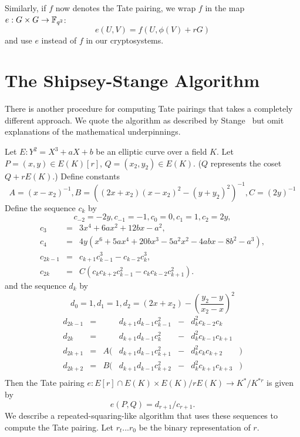 Similarly, if $f$ now denotes the Tate pairing,
we wrap $f$ in the map
$e : G\times G \rightarrow \mathbb{F}_{q^2}$:
\[ e(U, V) = f(U, \phi(V) + rG) \]
and use $e$ instead of $f$ in our cryptosystems.

\section {The Shipsey-Stange Algorithm}
There is another procedure for computing Tate pairings that takes a completely
different approach. We quote the algorithm as described by Stange~\cite{stange}
but omit explanations of the mathematical underpinnings.

Let $E:Y^2 = X^3 + aX + b$ be an elliptic curve over a field $K$.
Let $P=(x, y) \in E(K)[r]$, $Q=(x_2, y_2) \in E(K)$. ($Q$ represents the
coset $Q + rE(K)$.)
Define constants
\[
    A = (x - x_2)^{-1},
    B = \left((2x + x_2)(x - x_2)^2 - (y + y_2)^2\right)^{-1},
    C = (2 y)^{-1}
\]
Define the sequence $c_k$ by
\[
    c_{-2} = -2y,
    c_{-1} = -1,
    c_0 = 0,
    c_1 = 1,
    c_2 = 2 y,
\]
\[
\begin{array}{lcl}
    c_3 &=& 3 x^4 + 6ax^2 + 12bx - a^2, \\
    c_4 &=& 4y(x^6+5ax^4+20bx^3-5a^2x^2-4abx-8b^2-a^3), \\
    c_{2k-1} &=& c_{k+1} c_{k-1}^3 - c_{k-2} c_k^3, \\
    c_{2k} &=& C(c_k c_{k+2} c_{k-1}^2 - c_k c_{k-2} c_{k+1}^2).
\end{array}
\]
and the sequence $d_k$ by
\[
    d_0 = 1,
    d_1 = 1,
    d_2 = (2x+x_2) - \left( \frac{y_2-y}{x_2-x} \right) ^2
\]
\[
\begin{array}{lcrlcll}
    d_{2k-1} &=& & d_{k+1} d_{k-1} c_{k-1}^2 &-& d_k^2 c_{k-2} c_{k}& \\ 
    d_{2k} &=& & d_{k+1} d_{k-1} c_{k}^2 &-& d_k^2 c_{k-1} c_{k+1}& \\
    d_{2k+1} &=& A(& d_{k+1} d_{k-1} c_{k+1}^2 &-& d_k^2 c_{k} c_{k+2}&) \\
    d_{2k+2} &=& B(& d_{k+1} d_{k-1} c_{k+2}^2 &-& d_k^2 c_{k+1} c_{k+3}&) \\
\end{array}
\]
Then the Tate pairing
$
e : E[r] \cap E(K) \times
E(K) / r E(K) \rightarrow
K^* / K^{*r}
$
is given by
\[
e(P,Q) = d_{r+1}/c_{r+1}.
\]
We describe a repeated-squaring-like algorithm that uses these sequences
to compute the Tate pairing.
Let $r_t ... r_0$ be the binary representation of $r$.

